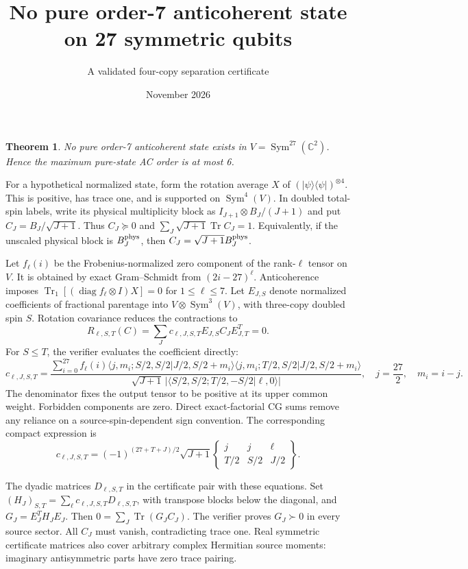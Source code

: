 \documentclass[11pt]{article}
\newtheorem{theorem}{Theorem}
\newcommand{\Tr}{\operatorname{Tr}}
\begin{document}
\title{No pure order-7 anticoherent state on 27 symmetric qubits}
\author{A validated four-copy separation certificate}\date{November 2026}\maketitle
\begin{theorem}No pure order-7 anticoherent state exists in $V=\operatorname{Sym}^{27}(\mathbb C^2)$. Hence the maximum pure-state AC order is at most 6.\end{theorem}
For a hypothetical normalized state, form the rotation average $X$ of $(|\psi\rangle\langle\psi|)^{\otimes4}$. This is positive, has trace one, and is supported on $\operatorname{Sym}^4(V)$. In doubled total-spin labels, write its physical multiplicity block as $I_{J+1}\otimes B_J/(J+1)$ and put $C_J=B_J/\sqrt{J+1}$. Thus $C_J\succeq0$ and $\sum_J\sqrt{J+1}\Tr C_J=1$. Equivalently, if the unscaled physical block is $B_J^{\rm phys}$, then $C_J=\sqrt{J+1}B_J^{\rm phys}$.

Let $f_\ell(i)$ be the Frobenius-normalized zero component of the rank-$\ell$ tensor on $V$. It is obtained by exact Gram--Schmidt from $(2i-27)^\ell$. Anticoherence imposes $\Tr_1[(\operatorname{diag}f_\ell\otimes I)X]=0$ for $1\le\ell\le 7$. Let $E_{J,S}$ denote normalized coefficients of fractional parentage into $V\otimes\operatorname{Sym}^3(V)$, with three-copy doubled spin $S$. Rotation covariance reduces the contractions to
\[
 R_{\ell,S,T}(C)=\sum_Jc_{\ell,J,S,T}E_{J,S}C_JE_{J,T}^T=0.
\]
For $S\le T$, the verifier evaluates the coefficient directly:
\[
 c_{\ell,J,S,T}=\frac{\sum_{i=0}^{27}f_\ell(i)
 \langle j,m_i;S/2,S/2|J/2,S/2+m_i\rangle
 \langle j,m_i;T/2,S/2|J/2,S/2+m_i\rangle}
 {\sqrt{J+1}\,|\langle S/2,S/2;T/2,-S/2|\ell,0\rangle|},
 \quad j=\frac{27}{2},\quad m_i=i-j.
\]
The denominator fixes the output tensor to be positive at its upper common weight. Forbidden components are zero. Direct exact-factorial CG sums remove any reliance on a source-spin-dependent sign convention. The corresponding compact expression is
\[
 c_{\ell,J,S,T}=(-1)^{(27+T+J)/2}\sqrt{J+1}
 \begin{Bmatrix}j&j&\ell\\T/2&S/2&J/2\end{Bmatrix}.
\]

The dyadic matrices $D_{\ell,S,T}$ in the certificate pair with these equations. Set $(H_J)_{S,T}=\sum_\ell c_{\ell,J,S,T}D_{\ell,S,T}$, with transpose blocks below the diagonal, and $G_J=E_J^TH_JE_J$. Then $0=\sum_J\Tr(G_JC_J)$. The verifier proves $G_J\succ0$ in every source sector. All $C_J$ must vanish, contradicting trace one. Real symmetric certificate matrices also cover arbitrary complex Hermitian source moments: imaginary antisymmetric parts have zero trace pairing.
\end{document}
